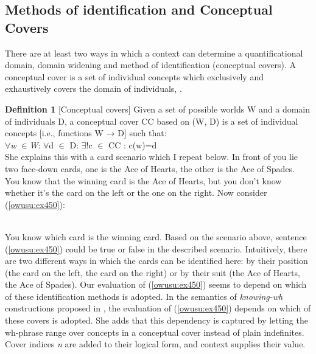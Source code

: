 \documentclass[output=paper,modfonts,nonflat,draftmode]{langsci/langscibook}
\begin{document}
\subsection{Methods of identification and Conceptual Covers}
There are at least two ways in which a context can determine a quantificational domain, domain widening and method of identification (conceptual covers). 
A conceptual cover is a set of individual concepts which exclusively and exhaustively covers the domain of individuals, \citep{Aloni2001}.

\textbf{Definition 1} [Conceptual covers] Given a set of possible worlds W and a domain of individuals D, a conceptual cover CC based on (W, D) is a set of individual concepts [i.e., functions W → D] such that:\\

$\forall$\emph{w} $\in$\emph{W}: $\forall$d $\in$ D: $\exists$!c $\in$ CC : c(w)=d \\

She explains this with a card scenario which I repeat below.
 In front of you lie two face-down cards, one is the Ace of Hearts, the other is the Ace of Spades. You know that the winning card is the Ace of Hearts, but you don’t know whether it’s the card on the left or the one on the right. Now consider (\ref{owusu:ex450}):

\ea\label{owusu:ex450}\\
 You know which card is the winning card.
\z Based on the scenario above, sentence (\ref{owusu:ex450}) could be true or false in the described scenario. Intuitively, there are two different ways in which the cards can be identified here: by their position (the card on the left, the card on the right) or by their suit (the Ace of Hearts, the Ace of Spades). Our evaluation of (\ref{owusu:ex450}) seems to depend on which of these identification methods is adopted. In the semantics of \emph{knowing-wh} constructions proposed in \citet{Aloni2001}, the evaluation of (\ref{owusu:ex450}) depends on which of these covers is adopted. She adds that this dependency is captured by letting the wh-phrase range over concepts in a conceptual cover instead of plain indefinites. Cover indices \emph{n} are added to their logical form, and context supplies their value. 
\end{document}
